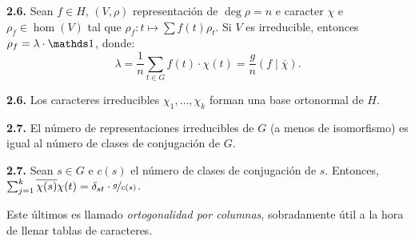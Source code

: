 \hypertarget{prop26}{}
\begin{proposition}
    \textbf{2.6.} Sean \(f \in H\), \((V,\rho)\) representación de \(\deg \rho = n\) e caracter \(\chi\) e  \( \rho_f\in \hom(V)\) tal que \(\rho_f : t \mapsto \sum f(t)\rho_t\). Si \(V\) es irreducible, entonces \(\rho_f = \lambda \cdot \id \), donde: 
    \[\lambda = \frac{1}{n} \sum_{t\in G} f(t) \cdot \chi(t) = \frac{g}{n} (f \mid \overline{\chi}).\]  
\end{proposition}


\hypertarget{thm26}{}
\begin{theorem}
    \textbf{2.6.} Los caracteres irreducibles \(\chi_1, \ldots , \chi_k\) forman una base ortonormal de \(H\).
\end{theorem}


\begin{theorem}
    \textbf{2.7.} El número de representaciones irreducibles de \(G\) (a menos de isomorfismo) es igual al número de clases de conjugación de \(G\). 
\end{theorem}

\begin{proposition}
    \textbf{2.7.} Sean \(s\in G\) e \(c(s)\) el número de clases de conjugación de \(s\). Entonces,  \(\sum_{j=1}^k \overline{\chi(s)} \chi(t) = \delta_{st} \cdot \nicefrac{g}{c(s)} \). 
\end{proposition}

\begin{note}
    Este últimos es llamado \emph{ortogonalidad por columnas}, sobradamente útil a la hora de llenar tablas de caracteres. 
\end{note}


